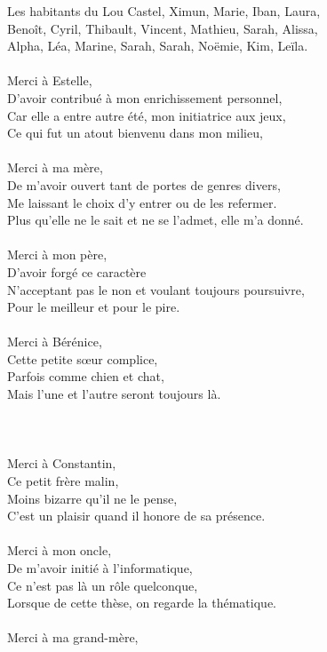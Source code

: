 \documentclass[english,a4paper,11pt,twoside]{StyleThese}
\begin{document}
Les habitants  du Lou Castel, Ximun, Marie, Iban, Laura,\\
Benoît, Cyril, Thibault, Vincent, Mathieu, Sarah, Alissa,\\
Alpha, Léa, Marine, Sarah, Sarah, Noëmie, Kim, Leïla.\\
\\
Merci à Estelle,\\
D'avoir contribué à mon enrichissement personnel,\\
Car elle a entre autre été, mon initiatrice aux jeux,\\
Ce qui fut un atout bienvenu dans mon milieu,\\
\\
Merci à ma mère,\\
De m'avoir ouvert tant de portes de genres divers,\\
Me laissant le choix d'y entrer ou de les refermer.\\
Plus qu'elle ne le sait et ne se l'admet, elle m'a donné.\\
\\
Merci à mon père,\\
D'avoir forgé ce caractère\\
N'acceptant pas le non et voulant toujours poursuivre,\\
Pour le meilleur et pour le pire.\\
\\
Merci à Bérénice,\\
Cette petite s\oe{}ur complice,\\
Parfois comme chien et chat,\\
Mais l'une et l'autre seront toujours là.\\
\\
\\
\\
Merci à Constantin,\\
Ce petit frère malin,\\
Moins bizarre qu'il ne le pense,\\
C'est un plaisir quand il honore de sa présence.\\
\\
Merci à mon oncle,\\
De m'avoir initié à l'informatique,\\
Ce n'est pas là un rôle quelconque,\\
Lorsque de cette thèse, on regarde la thématique.\\
\\
Merci à ma grand-mère,\\
\end{document}

